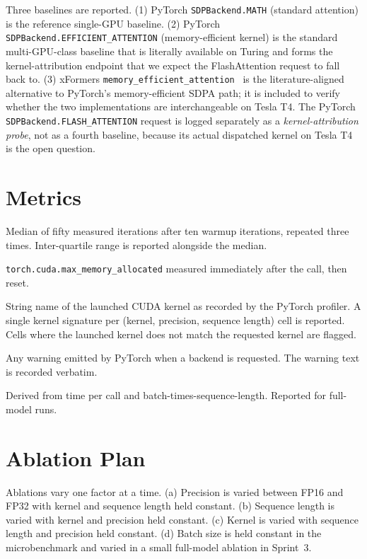 \documentclass[11pt]{article}
\begin{document}
Three baselines are reported. (1) PyTorch \texttt{SDPBackend.MATH} (standard attention) is the reference single-GPU baseline. (2) PyTorch \texttt{SDPBackend.EFFICIENT\_ATTENTION} (memory-efficient kernel) is the standard multi-GPU-class baseline that is literally available on Turing and forms the kernel-attribution endpoint that we expect the FlashAttention request to fall back to. (3) xFormers \texttt{memory\_efficient\_attention}~\parencite{xformers2022} is the literature-aligned alternative to PyTorch's memory-efficient SDPA path; it is included to verify whether the two implementations are interchangeable on Tesla T4. The PyTorch \texttt{SDPBackend.FLASH\_ATTENTION} request is logged separately as a \emph{kernel-attribution probe}, not as a fourth baseline, because its actual dispatched kernel on Tesla T4 is the open question.

\section{Metrics}

\begin{description}[leftmargin=2em]
    \item[Time per call (milliseconds).] Median of fifty measured iterations after ten warmup iterations, repeated three times. Inter-quartile range is reported alongside the median.
    \item[Peak GPU memory (megabytes).] \texttt{torch.cuda.max\_memory\_allocated} measured immediately after the call, then reset.
    \item[Kernel signature.] String name of the launched CUDA kernel as recorded by the PyTorch profiler. A single kernel signature per (kernel, precision, sequence length) cell is reported. Cells where the launched kernel does not match the requested kernel are flagged.
    \item[Backend warning text.] Any warning emitted by PyTorch when a backend is requested. The warning text is recorded verbatim.
    \item[Throughput proxy: tokens per second per GPU.] Derived from time per call and batch-times-sequence-length. Reported for full-model runs.
\end{description}

\section{Ablation Plan}

Ablations vary one factor at a time. (a) Precision is varied between FP16 and FP32 with kernel and sequence length held constant. (b) Sequence length is varied with kernel and precision held constant. (c) Kernel is varied with sequence length and precision held constant. (d) Batch size is held constant in the microbenchmark and varied in a small full-model ablation in Sprint~3.
\end{document}
